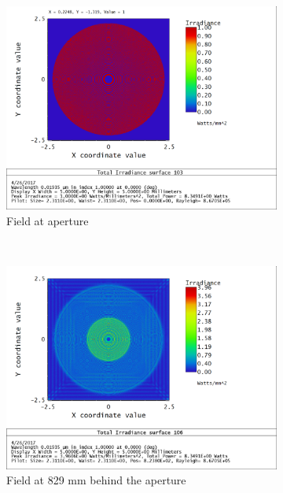 \documentclass[10pt,letterpaper]{article}
\begin{document}
				\begin{figure}[h!]
					\centering
					\begin{subfigure}[t]{0.49\textwidth}
						\includegraphics[width=\textwidth]{pop/pop103}
						\caption{Field at aperture}
						\label{pop1}
					\end{subfigure}
					~
					\begin{subfigure}[t]{0.49\textwidth}
						\includegraphics[width=\textwidth]{pop/pop106}	
						\caption{Field at 829 mm behind the aperture}
						\label{pop2}
					\end{subfigure}
					\begin{subfigure}[t]{0.49\textwidth}

\end{subfigure}
\end{figure}
\end{document}
